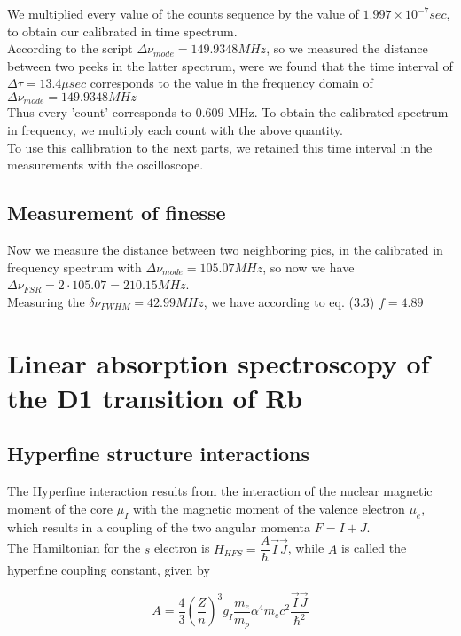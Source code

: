 \documentclass[openany,11pt,a4paper]{book}
\begin{document}
We multiplied every value of the counts sequence by the value of $1.997 \times 10^{-7} sec$, to obtain our calibrated in time spectrum.\\

According to the script $ \Delta \nu_{ mode}=149.9348 MHz$, so we measured the distance between two peeks in the latter spectrum, were we found that the time interval of $\Delta \tau = 13.4 \mu sec $ corresponds to the value in the frequency domain of $\Delta \nu _{mode}= 149.9348 MHz$\\

Thus every 'count' corresponds to $0.609$ MHz. To obtain the calibrated spectrum in frequency, we multiply each count with the above quantity.\\

To use this callibration to the next parts, we retained this time interval in the measurements with the oscilloscope.


\section{Measurement of finesse}

Now we measure the distance between two neighboring pics, in the calibrated in frequency spectrum with $\Delta \nu_{ mode}= 105.07 MHz$, so now we have $\Delta \nu_{FSR}=2 \cdot 105.07 =210.15 MHz$.\\
Measuring the $\delta \nu_{ FWHM} = 42.99 MHz$, we have according to eq. (3.3) $f=4.89$


\chapter{Linear absorption spectroscopy of the D1 transition of Rb}

   
\section{ Hyperfine structure interactions}

The Hyperfine interaction results from the interaction of the nuclear magnetic moment of the core $\mu_{I}$ with the magnetic moment of the valence electron $\mu_{e}$, which results in a coupling of the two angular momenta $F=I+J$.\\
The Hamiltonian for the $s$ electron is $H_{HFS}= \dfrac{A}{\hbar} \vec{I} \vec{J}$, while $A$  is called the hyperfine coupling constant, given by 

\begin{equation}
A= \dfrac{4}{3} (\dfrac{Z}{n})^{3} g_{I} \dfrac{m_{e}}{m_{p}}\alpha^{4} m_{e} c^{2} \dfrac{\vec{I} \vec{J}}{\hbar^{2}}
\end{equation}
\end{document}
